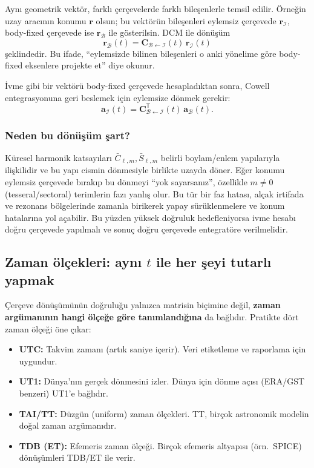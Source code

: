 Aynı geometrik vektör, farklı çerçevelerde farklı bileşenlerle temsil edilir. Örneğin uzay aracının konumu
$\mathbf r$ olsun; bu vektörün bileşenleri eylemsiz çerçevede $\mathbf r_{\mathcal I}$,
body-fixed çerçevede ise $\mathbf r_{\mathcal B}$ ile gösterilsin. DCM ile dönüşüm
\begin{equation}
\label{eq:ri_to_rb}
\mathbf r_{\mathcal B}(t)=\mathbf C_{\mathcal B\leftarrow\mathcal I}(t)\,\mathbf r_{\mathcal I}(t)
\end{equation}
şeklindedir. Bu ifade, ``eylemsizde bilinen bileşenleri o anki yönelime göre body-fixed eksenlere projekte et'' diye okunur.

İvme gibi bir vektörü body-fixed çerçevede hesapladıktan sonra, Cowell entegrasyonuna geri beslemek için eylemsize dönmek gerekir:
\begin{equation}
\label{eq:ab_to_ai}
\mathbf a_{\mathcal I}(t)=\mathbf C_{\mathcal B\leftarrow\mathcal I}^{\mathsf T}(t)\,\mathbf a_{\mathcal B}(t).
\end{equation}

\subsubsection{Neden bu dönüşüm şart?}
\label{subsubsec:why_transform}

Küresel harmonik katsayıları $\bar C_{\ell,m},\bar S_{\ell,m}$ belirli boylam/enlem yapılarıyla ilişkilidir ve bu yapı
cismin dönmesiyle birlikte uzayda döner. Eğer konumu eylemsiz çerçevede bırakıp bu dönmeyi ``yok sayarsanız'',
özellikle $m\neq0$ (tesseral/sectoral) terimlerin fazı yanlış olur. Bu tür bir faz hatası, alçak irtifada ve
rezonans bölgelerinde zamanla birikerek yapay sürüklenmelere ve konum hatalarına yol açabilir.
Bu yüzden yüksek doğruluk hedefleniyorsa ivme hesabı doğru çerçevede yapılmalı ve sonuç doğru çerçevede entegratöre verilmelidir.

\subsection{Zaman ölçekleri: aynı $t$ ile her şeyi tutarlı yapmak}
\label{subsec:time_scales}

Çerçeve dönüşümünün doğruluğu yalnızca matrisin biçimine değil, \textbf{zaman argümanının hangi ölçeğe göre tanımlandığına}
da bağlıdır. Pratikte dört zaman ölçeği öne çıkar:
\begin{itemize}
\item \textbf{UTC:} Takvim zamanı (artık saniye içerir). Veri etiketleme ve raporlama için uygundur.
\item \textbf{UT1:} Dünya'nın gerçek dönmesini izler. Dünya için dönme açısı (ERA/GST benzeri) UT1'e bağlıdır.
\item \textbf{TAI/TT:} Düzgün (uniform) zaman ölçekleri. TT, birçok astronomik modelin doğal zaman argümanıdır.
\item \textbf{TDB (ET):} Efemeris zaman ölçeği. Birçok efemeris altyapısı (örn.\ SPICE) dönüşümleri TDB/ET ile verir.
\end{itemize}

